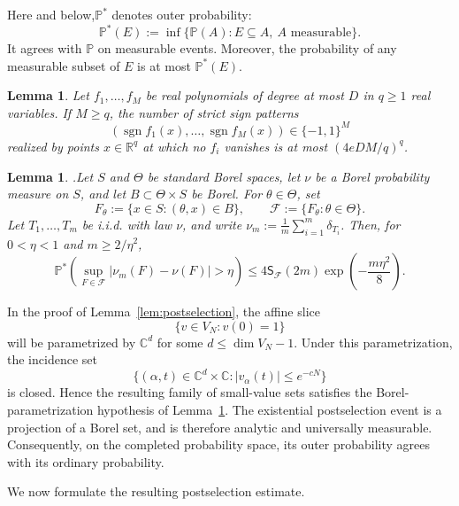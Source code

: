 \documentclass[10pt,reqno]{amsart}
\newtheorem{lemma}[theorem]{Lemma}
\theoremstyle{remark}
\newcommand{\R}{\mathbb R}
\newcommand{\Prob}{\mathbb P}
\begin{document}
Here and below,$\Prob^*$ denotes outer probability:
\[\Prob^*(E):=\inf\{\Prob(A):E\subseteq A,\ A\text{ measurable}\}.\]
It agrees with $\Prob$ on measurable events. Moreover, the probability of any measurable subset of $E$ is at most $\Prob^*(E)$.
\begin{lemma}\cite[Theorem~3]{War68}\label{lem:warren}
    Let $f_1,\ldots, f_M$ be real polynomials of degree at most $D$ in $q\ge 1$ real variables. If $M\ge q$, the number of strict sign patterns
    \[\left(\operatorname{sgn}f_1(x),\ldots,\operatorname{sgn}f_M(x)\right)\in\{-1,1\}^M \] realized by points $x\in \R^q$ at which no $f_i$ vanishes is at most $(4eDM/q)^q$. 
\end{lemma}

\begin{lemma}\cite[Theorem~2]{VC71}.\label{lem:vc-uniform}
Let $S$ and $\Theta$ be standard Borel spaces, let $\nu$ be a Borel probability measure on $S$, and let $B\subset\Theta\times S$ be Borel. For $\theta\in\Theta$, set
\[F_\theta:=\{x\in S:(\theta,x)\in B\},
    \qquad \mathcal F:=\{F_\theta:\theta\in\Theta\}.\]
Let $T_1,\ldots,T_m$ be i.i.d. with law $\nu$, and write $\nu_m:=\frac{1}{m}\sum_{i=1}^m\delta_{T_i}$.
Then, for $0<\eta<1$ and $m\ge 2/\eta^2$,
\[\Prob^*\!\left(\sup_{F\in\mathcal F}|\nu_m(F)-\nu(F)|>\eta\right)
 \le
 4\mathsf{S}_{\mathcal F}(2m)\exp\left(-\frac{m\eta^2}{8}\right).\]
\end{lemma}

In the proof of Lemma~\ref{lem:postselection}, the affine slice
\[
\{v\in V_N:v(0)=1\}
\]
will be parametrized by \(\mathbb C^d\) for some
\(d\leq \dim V_N-1\). Under this parametrization, the incidence set
\[
\{(\alpha,t)\in\mathbb C^d\times\mathbb C:
|v_\alpha(t)|\leq e^{-cN}\}
\]
is closed. Hence the resulting family of small-value sets satisfies
the Borel-parametrization hypothesis of Lemma~\ref{lem:vc-uniform}.
The existential postselection event is a projection of a Borel set,
and is therefore analytic and universally measurable. Consequently,
on the completed probability space, its outer probability agrees
with its ordinary probability.

We now formulate the resulting postselection estimate.
\end{document}
